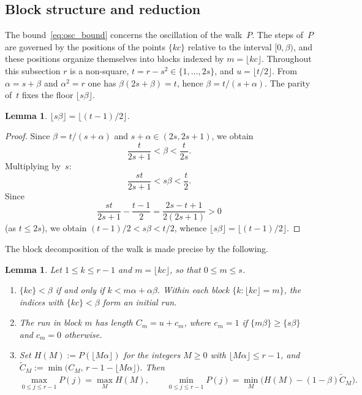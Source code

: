 \documentclass{birkjour}
\newtheorem{lemma}[theorem]{Lemma}
\theoremstyle{definition}
\theoremstyle{remark}
\newcommand{\fl}[1]{\lfloor #1 \rfloor}
\newcommand{\frc}[1]{\{ #1 \}}
\begin{document}
\subsection{Block structure and reduction}
\label{ssec:blocks}

The bound~\eqref{eq:osc_bound} concerns the oscillation of
the walk~$P$. The steps of~$P$ are governed by the positions
of the points $\frc{kc}$ relative to the interval
$[0,\beta)$, and these positions organize themselves into
blocks indexed by $m=\fl{kc}$. Throughout this subsection $r$
is a non-square, $t=r-s^{2}\in\{1,\ldots,2s\}$, and
$u=\fl{t/2}$. From $\alpha=s+\beta$ and $\alpha^{2}=r$ one has
$\beta(2s+\beta)=t$, hence $\beta=t/(s+\alpha)$. The parity
of~$t$ fixes the floor $\fl{s\beta}$.

\begin{lemma}\label{lem:floor_sbeta}
$\fl{s\beta}=\fl{(t{-}1)/2}$.
\end{lemma}

\begin{proof}
Since $\beta=t/(s+\alpha)$ and
$s+\alpha\in(2s,2s{+}1)$, we obtain
\[
  \frac{t}{2s{+}1}<\beta<\frac{t}{2s}.
\]
Multiplying by~$s$:
\[
  \frac{st}{2s{+}1}<s\beta<\frac{t}{2}.
\]
Since
\[
  \frac{st}{2s{+}1}-\frac{t{-}1}{2}
  =\frac{2s{-}t{+}1}{2(2s{+}1)}>0
\]
(as $t\le 2s$), we obtain
$(t{-}1)/2<s\beta<t/2$, whence
$\fl{s\beta}=\fl{(t{-}1)/2}$.
\end{proof}

The block decomposition of the walk is made precise by the
following.

\begin{lemma}\label{lem:blocks}
Let $1\le k\le r-1$ and $m=\fl{kc}$, so that $0\le m\le s$.
\begin{enumerate}
\item[\textup{(a)}] $\frc{kc}<\beta$ if and only if
$k<m\alpha+\alpha\beta$. Within each block
$\{k:\fl{kc}=m\}$, the indices with $\frc{kc}<\beta$ form an
initial run.
\item[\textup{(b)}] The run in block $m$ has length
$C_{m}=u+c_{m}$, where $c_{m}=1$ if
$\frc{m\beta}\ge\frc{s\beta}$ and $c_{m}=0$ otherwise.
\item[\textup{(c)}] Set $H(M):=P(\fl{M\alpha})$ for the
integers $M\ge 0$ with $\fl{M\alpha}\le r-1$, and
$\widetilde{C}_{M}:=\min\bigl(C_{M},\,r-1-\fl{M\alpha}\bigr)$.
Then
\[
  \max_{0\le j\le r-1}P(j)=\max_{M}H(M),
  \qquad
  \min_{0\le j\le r-1}P(j)
  =\min_{M}\bigl(H(M)-(1-\beta)\widetilde{C}_{M}\bigr).
\]
\end{enumerate}
\end{lemma}
\end{document}
